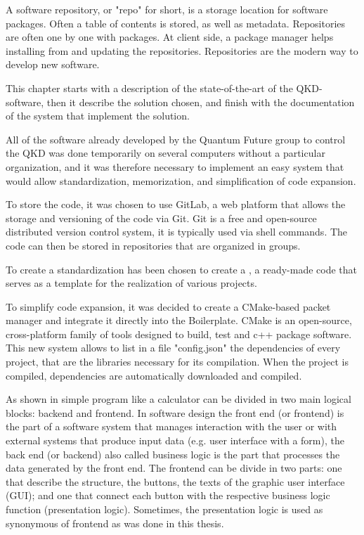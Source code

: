 A software repository, or "repo" for short, is a storage location for software packages. Often a table of contents is stored, as well as metadata. Repositories are often one by one with packages. At client side, a package manager helps installing from and updating the repositories. Repositories are the modern way to develop new software.

This chapter starts with a description of the state-of-the-art of the QKD-software, then it describe the solution chosen, and finish with the documentation of the system that implement the solution.

\newpage

All of the software already developed by the Quantum Future group to control the QKD was done temporarily on several computers without a particular organization, and it was therefore necessary to implement an easy system that would allow standardization, memorization, and simplification of code expansion.

To store the code, it was chosen to use GitLab, a web platform that allows the storage and versioning of the code via Git. Git is a free and open-source distributed version control system, it is typically used via shell commands.
The code can then be stored in repositories that are organized in groups.

To create a standardization has been chosen to create a , a ready-made code that serves as a template for the realization of various projects.

To simplify code expansion, it was decided to create a CMake-based packet manager and integrate it directly into the Boilerplate. CMake is an open-source, cross-platform family of tools designed to build, test and c++ package software.
This new system allows to list in a file "config.json" the dependencies of every project, that are the libraries necessary for its compilation.
When the project is compiled, dependencies are automatically downloaded and compiled.

As shown in  simple program like a calculator can be divided in two main logical blocks: backend and frontend.
In software design the front end (or frontend) is the part of a software system that manages interaction with the user or with external systems that produce input data (e.g. user interface with a form), the back end (or backend) also called business logic is the part that processes the data generated by the front end. The frontend can be divide in two parts: one that describe the structure, the buttons, the texts of the graphic user interface (GUI); and one that connect each button with the respective business logic function (presentation logic). Sometimes, the presentation logic is used as synonymous of frontend as was done in this thesis.

